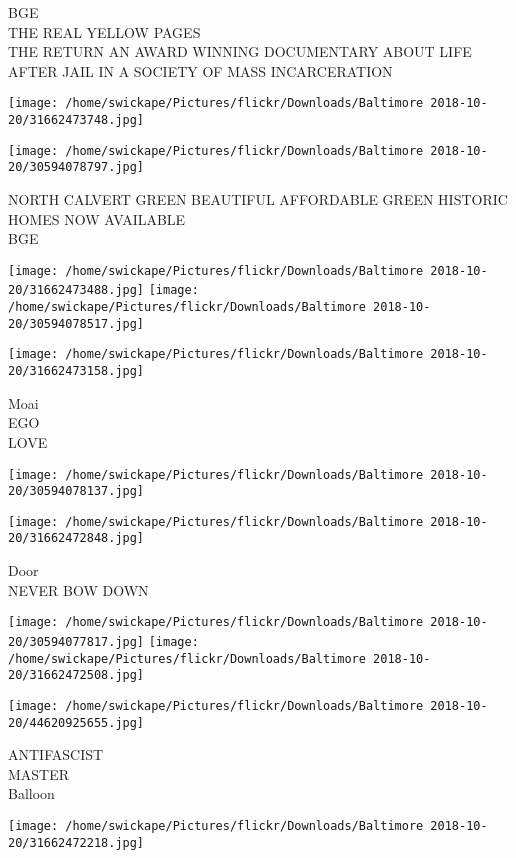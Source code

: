 \documentclass[10pt,letterpaper]{article}
\begin{document}
BGE\\
THE REAL YELLOW PAGES\\
THE RETURN AN AWARD WINNING DOCUMENTARY ABOUT LIFE AFTER JAIL IN A SOCIETY OF MASS INCARCERATION
\pagebreak

\texttt{[image: /home/swickape/Pictures/flickr/Downloads/Baltimore 2018-10-20/31662473748.jpg]}

\vspace{0.25in}
\texttt{[image: /home/swickape/Pictures/flickr/Downloads/Baltimore 2018-10-20/30594078797.jpg]}

NORTH CALVERT GREEN BEAUTIFUL AFFORDABLE GREEN HISTORIC HOMES NOW AVAILABLE\\
BGE
\pagebreak

\texttt{[image: /home/swickape/Pictures/flickr/Downloads/Baltimore 2018-10-20/31662473488.jpg]}
\texttt{[image: /home/swickape/Pictures/flickr/Downloads/Baltimore 2018-10-20/30594078517.jpg]}

\texttt{[image: /home/swickape/Pictures/flickr/Downloads/Baltimore 2018-10-20/31662473158.jpg]}

Moai\\
EGO\\
LOVE
\pagebreak

\texttt{[image: /home/swickape/Pictures/flickr/Downloads/Baltimore 2018-10-20/30594078137.jpg]}

\vspace{0.25in}
\texttt{[image: /home/swickape/Pictures/flickr/Downloads/Baltimore 2018-10-20/31662472848.jpg]}

Door\\
NEVER BOW DOWN
\pagebreak

\texttt{[image: /home/swickape/Pictures/flickr/Downloads/Baltimore 2018-10-20/30594077817.jpg]}
\texttt{[image: /home/swickape/Pictures/flickr/Downloads/Baltimore 2018-10-20/31662472508.jpg]}

\vspace{0.25in}
\texttt{[image: /home/swickape/Pictures/flickr/Downloads/Baltimore 2018-10-20/44620925655.jpg]}

ANTIFASCIST\\
MASTER\\
Balloon
\pagebreak

\texttt{[image: /home/swickape/Pictures/flickr/Downloads/Baltimore 2018-10-20/31662472218.jpg]}
\end{document}
